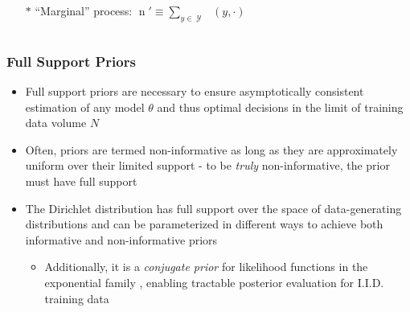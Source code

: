 \documentclass[aspectratio=169,usenames,dvipsnames]{beamer}
\DeclareMathOperator{\nrm}{\mathrm{n}}
\DeclareMathOperator{\nbarrm}{\bar{\mathrm{n}}}
\DeclareMathOperator{\Ycal}{\mathcal{Y}}
\begin{document}
\begin{frame}
\begin{columns}[c]
\begin{column}{.5\linewidth}
\vspace{1em}
\begin{itemize}
\item[$*$] ``Marginal'' process: $\nrm' \equiv \sum_{y \in \Ycal} \nbarrm(y,\cdot)$ 
\end{itemize}


\end{column}

\end{columns}

\end{frame}





\begin{frame}
\frametitle{Full Support Priors}

\begin{itemize}
\item Full support priors are necessary to ensure \alert{asymptotically consistent} estimation of any model $\theta$ and thus optimal decisions in the limit of training data volume $N$
\vspace{0.5em}
\item Often, priors are termed non-informative as long as they are approximately uniform over their limited support - to be \emph{truly} non-informative, the prior must have full support
\vspace{0.5em}
\item The \alert{Dirichlet distribution} has full support over the space of data-generating distributions and can be parameterized in different ways to achieve both informative and non-informative priors
	\vspace{0.25em}
	\begin{itemize}
	\item Additionally, it is a \emph{conjugate prior} for likelihood functions in the exponential family \cite{theodoridis-ML}, enabling tractable posterior evaluation for I.I.D. training data
	\end{itemize}
\end{itemize}

\end{frame}
\end{document}
